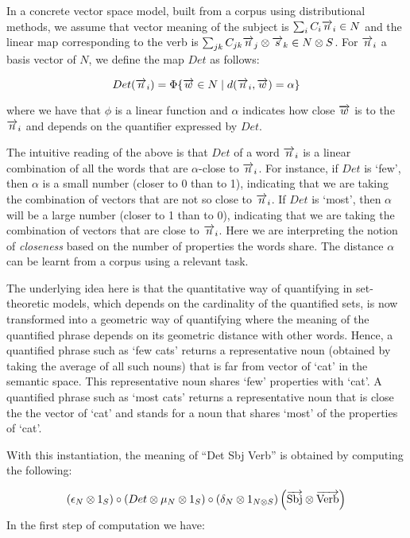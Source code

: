 \documentclass[a4paper,11pt]{easychair}
\begin{document}
In a concrete vector space model, built from a corpus using distributional methods, we assume that  vector meaning of the subject is
$\sum_i C_i \overrightarrow{n}_i \in N$ and the linear map corresponding to the verb is  $\sum_{jk} C_{jk} \overrightarrow{n}_j \otimes \overrightarrow{s}_k \in N \otimes S$.  For $\overrightarrow{n}_i$ a basis vector of $N$, we define  the map $Det$  as follows:

\begin{equation}\label{eqDet}
Det(\overrightarrow{n}_i) = \Phi \{\overrightarrow{w} \in N \mid d(\overrightarrow{n}_i, \overrightarrow{w}) = \alpha\}
\end{equation}

\noindent
where we have that   $\phi$ is a linear  function and   $\alpha$ indicates how close $\overrightarrow{w}$ is to the $\overrightarrow{n}_i$ and depends on the quantifier expressed by $Det$. 


The intuitive reading of the above is that $Det$ of a word $\overrightarrow{n}_i$ is a linear combination  of all the words that are $\alpha$-close to $\overrightarrow{n}_i$.  For instance, if $Det$ is `few', then $\alpha$ is a small number (closer to 0 than to 1), indicating that we are taking the combination of vectors that are not so close to $\overrightarrow{n}_i$. If $Det$ is `most', then $\alpha$ will be a large number (closer to 1 than to 0), indicating that we are taking the combination of vectors that are close to $\overrightarrow{n}_i$.  Here we are interpreting the notion of \emph{closeness}  based on   the number of properties the words share. The distance $\alpha$ can be learnt from a corpus using a relevant task. 

The underlying idea here is that the quantitative way of quantifying in set-theoretic models, which depends on the cardinality of the quantified sets, is now transformed into a geometric way of quantifying where the meaning of the quantified phrase depends on its geometric distance with other words. Hence, a quantified phrase such as `few cats' returns a representative noun (obtained by taking the average of all such nouns) that is far from vector of  `cat'  in the semantic space. This representative noun shares `few' properties with `cat'. A quantified phrase such as `most cats' returns a representative noun that is close the the vector of `cat' and stands for a noun that shares `most' of the properties of `cat'. 


With this instantiation, the  meaning of ``Det Sbj Verb'' is obtained by computing the following:

\[
(\epsilon_N \otimes 1_S) \circ (Det \otimes  \mu_N \otimes 1_S) \circ (\delta_N \otimes 1_{N \otimes S})\left(\overrightarrow{\text{Sbj}} \otimes \overrightarrow{\text{Verb}}\right)
\]
In the first step of computation we have:
\end{document}
